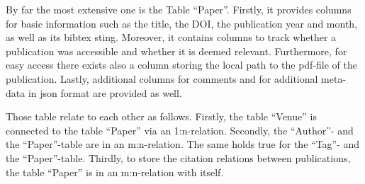 \documentclass[11pt,a4paper]{book}
\theoremstyle{definition}
\theoremstyle{definition}
\theoremstyle{definition}
\theoremstyle{remark}
\begin{document}
By far the most extensive one is the Table ``Paper''. 
Firstly, it provides columns for basic information such as the title, the DOI, the publication year and month, as well as its bibtex sting.
Moreover, it contains columns to track whether a publication was accessible and whether it is deemed relevant. 
Furthermore, for easy access there exists also a column storing the local path to the pdf-file of the publication.
Lastly, additional columns for comments and for additional meta-data in json format are provided as well.


Those table relate to each other as follows. 
Firstly, the table ``Venue'' is connected to the table ``Paper'' via an 1:n-relation.
Secondly, the ``Author''- and the ``Paper''-table are in an m:n-relation. The same holds true for the ``Tag''- and the ``Paper''-table.
Thirdly, to store the citation relations between publications, the table ``Paper'' is in an m:n-relation with itself.
\end{document}
